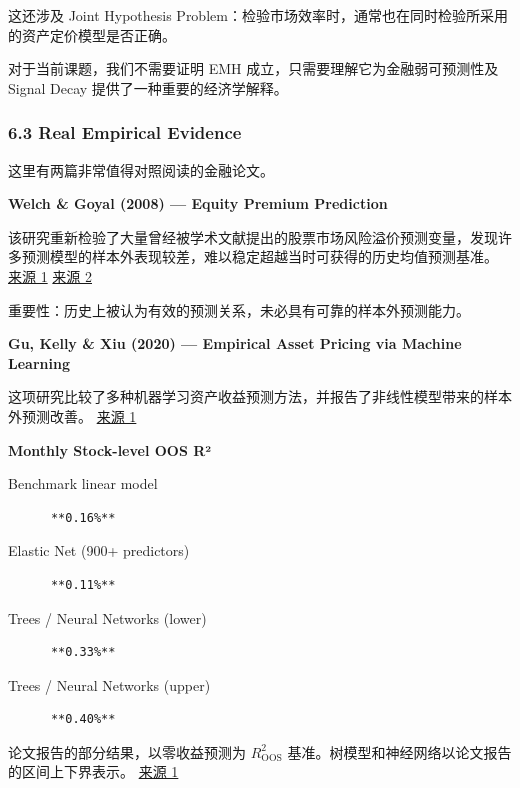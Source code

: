 这还涉及 Joint Hypothesis Problem：检验市场效率时，通常也在同时检验所采用的资产定价模型是否正确。

对于当前课题，我们不需要证明 EMH 成立，只需要理解它为金融弱可预测性及 Signal Decay 提供了一种重要的经济学解释。

\hypertarget{part-4-60-0001-real-empirical-evidence}{%
\subsubsection{6.3 Real Empirical Evidence}\label{part-4-60-0001-real-empirical-evidence}}

这里有两篇非常值得对照阅读的金融论文。

\textbf{Welch \& Goyal (2008) --- Equity Premium Prediction}

该研究重新检验了大量曾经被学术文献提出的股票市场风险溢价预测变量，发现许多预测模型的样本外表现较差，难以稳定超越当时可获得的历史均值预测基准。 \href{https://doi.org/10.1093/RFS/HHM014}{来源 1} \href{https://www.nber.org/papers/w10483}{来源 2}

重要性：历史上被认为有效的预测关系，未必具有可靠的样本外预测能力。

\textbf{Gu, Kelly \& Xiu (2020) --- Empirical Asset Pricing via Machine Learning}

这项研究比较了多种机器学习资产收益预测方法，并报告了非线性模型带来的样本外预测改善。 \href{https://academic.oup.com/rfs/article/33/5/2223/5758276}{来源 1}

\textbf{Monthly Stock-level OOS R²}

Benchmark linear model

\begin{verbatim}
      **0.16%**
\end{verbatim}

Elastic Net (900+ predictors)

\begin{verbatim}
      **0.11%**
\end{verbatim}

Trees / Neural Networks (lower)

\begin{verbatim}
      **0.33%**
\end{verbatim}

Trees / Neural Networks (upper)

\begin{verbatim}
      **0.40%**
\end{verbatim}

论文报告的部分结果，以零收益预测为 \(R^2_{\mathrm{OOS}}\) 基准。树模型和神经网络以论文报告的区间上下界表示。 \href{https://doi.org/10.1093/rfs/hhaa009}{来源 1}

